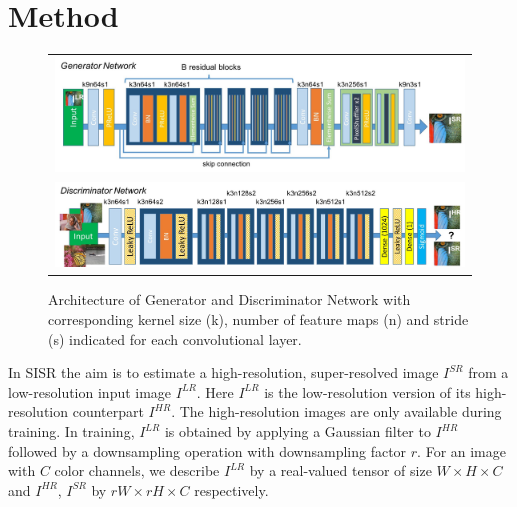 \documentclass[10pt,twocolumn,letterpaper]{article}
\begin{document}
\section{Method}
\label{sec:method}

\begin{figure}[ht!]
\begin{center}
	  	\begin{tabular}{c}
     	\includegraphics[width=6.5in]{images/used/jpg/generator}\\
     	\includegraphics[width=6.5in]{images/used/jpg/discriminator}
  	\end{tabular}
\end{center}
  		\caption{Architecture of Generator and Discriminator Network with corresponding kernel size (k), number of feature maps (n) and stride (s) indicated for each convolutional layer.} 
	\label{fig:generator}
\end{figure}
%
	In \ac{SISR} the aim is to estimate a high-resolution, super-resolved image $I^{SR}$ from a low-resolution input image $I^{LR}$. Here $I^{LR}$ is the low-resolution version of its high-resolution counterpart $I^{HR}$. The high-resolution images are only available during training. In training, $I^{LR}$ is obtained by applying a Gaussian filter to $I^{HR}$ followed by a downsampling operation with downsampling factor $r$. For an image with $C$ color channels, we describe $I^{LR}$ by a real-valued tensor of size $W \times H \times C$ and $I^{HR}$, $I^{SR}$ by $rW \times rH \times C$ respectively.
\end{document}

